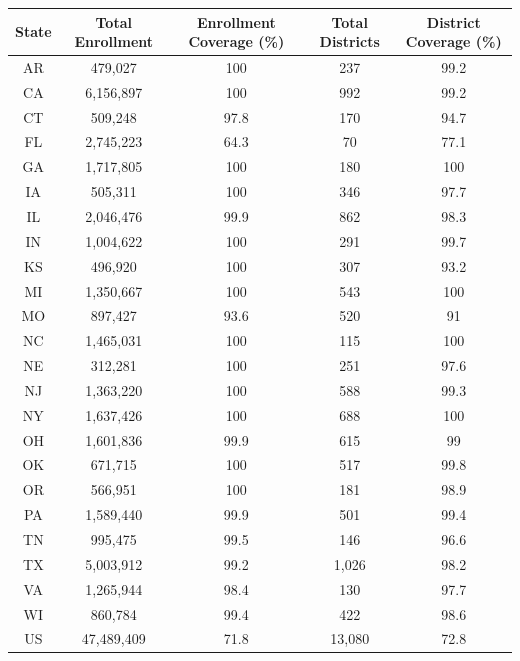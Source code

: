 
\begin{tabular}{ccccc}
\toprule
State & Total Enrollment & Enrollment Coverage (\%) & Total Districts & District Coverage (\%)\\
\midrule
AR & 479,027 & 100 & 237 & 99.2\\
CA & 6,156,897 & 100 & 992 & 99.2\\
CT & 509,248 & 97.8 & 170 & 94.7\\
FL & 2,745,223 & 64.3 & 70 & 77.1\\
GA & 1,717,805 & 100 & 180 & 100\\
\addlinespace
IA & 505,311 & 100 & 346 & 97.7\\
IL & 2,046,476 & 99.9 & 862 & 98.3\\
IN & 1,004,622 & 100 & 291 & 99.7\\
KS & 496,920 & 100 & 307 & 93.2\\
MI & 1,350,667 & 100 & 543 & 100\\
\addlinespace
MO & 897,427 & 93.6 & 520 & 91\\
NC & 1,465,031 & 100 & 115 & 100\\
NE & 312,281 & 100 & 251 & 97.6\\
NJ & 1,363,220 & 100 & 588 & 99.3\\
NY & 1,637,426 & 100 & 688 & 100\\
\addlinespace
OH & 1,601,836 & 99.9 & 615 & 99\\
OK & 671,715 & 100 & 517 & 99.8\\
OR & 566,951 & 100 & 181 & 98.9\\
PA & 1,589,440 & 99.9 & 501 & 99.4\\
TN & 995,475 & 99.5 & 146 & 96.6\\
\addlinespace
TX & 5,003,912 & 99.2 & 1,026 & 98.2\\
VA & 1,265,944 & 98.4 & 130 & 97.7\\
WI & 860,784 & 99.4 & 422 & 98.6\\
US & 47,489,409 & 71.8 & 13,080 & 72.8\\
\bottomrule
\end{tabular}

